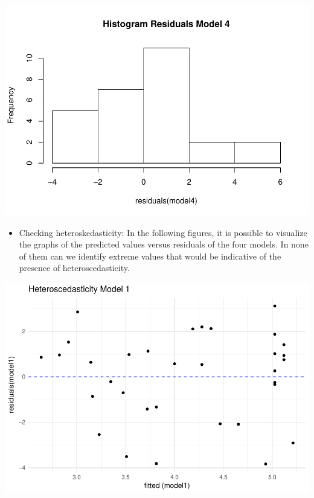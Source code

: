 \documentclass[]{elsarticle} %
\makeatletter
\providecommand{\tightlist}{%
  \setlength{\itemsep}{0pt}\setlength{\parskip}{0pt}}
\def\maxwidth{\ifdim\Gin@nat@width>\linewidth\linewidth
\else\Gin@nat@width\fi}
\let\Oldincludegraphics\includegraphics
\renewcommand{\includegraphics}[1]{\Oldincludegraphics[width=\maxwidth]{#1}}
\makeatother
\begin{document}
\includegraphics{stephanie-moura-rmarkdown-tf-ad-ufpe-2018_files/figure-latex/ggplot_resmodel_4-1.pdf}

\begin{itemize}
\tightlist
\item
  Checking heteroskedasticity: In the following figures, it is possible
  to visualize the graphs of the predicted values versus residuals of
  the four models. In none of them can we identify extreme values that
  would be indicative of the presence of heteroscedasticity.
\end{itemize}

\includegraphics{stephanie-moura-rmarkdown-tf-ad-ufpe-2018_files/figure-latex/ggplot_model_1-1.pdf}
\end{document}
